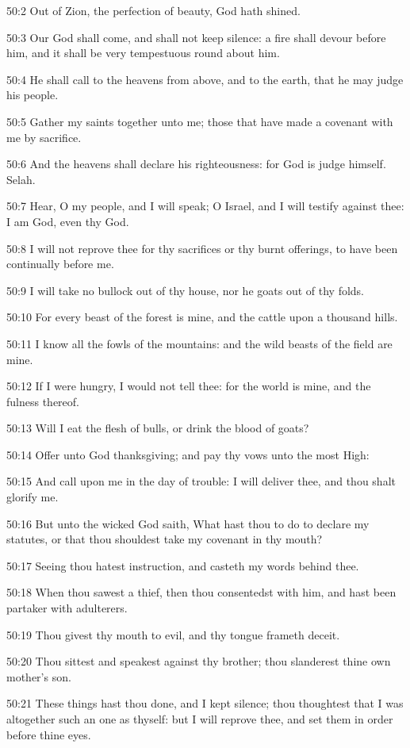 50:2 Out of Zion, the perfection of beauty, God hath shined.

50:3 Our God shall come, and shall not keep silence: a fire shall devour before him, and it shall be very tempestuous round about him.

50:4 He shall call to the heavens from above, and to the earth, that he may judge his people.

50:5 Gather my saints together unto me; those that have made a covenant with me by sacrifice.

50:6 And the heavens shall declare his righteousness: for God is judge himself. Selah.

50:7 Hear, O my people, and I will speak; O Israel, and I will testify against thee: I am God, even thy God.

50:8 I will not reprove thee for thy sacrifices or thy burnt offerings, to have been continually before me.

50:9 I will take no bullock out of thy house, nor he goats out of thy folds.

50:10 For every beast of the forest is mine, and the cattle upon a thousand hills.

50:11 I know all the fowls of the mountains: and the wild beasts of the field are mine.

50:12 If I were hungry, I would not tell thee: for the world is mine, and the fulness thereof.

50:13 Will I eat the flesh of bulls, or drink the blood of goats?

50:14 Offer unto God thanksgiving; and pay thy vows unto the most High:

50:15 And call upon me in the day of trouble: I will deliver thee, and thou shalt glorify me.

50:16 But unto the wicked God saith, What hast thou to do to declare my statutes, or that thou shouldest take my covenant in thy mouth?

50:17 Seeing thou hatest instruction, and casteth my words behind thee.

50:18 When thou sawest a thief, then thou consentedst with him, and hast been partaker with adulterers.

50:19 Thou givest thy mouth to evil, and thy tongue frameth deceit.

50:20 Thou sittest and speakest against thy brother; thou slanderest thine own mother's son.

50:21 These things hast thou done, and I kept silence; thou thoughtest that I was altogether such an one as thyself: but I will reprove thee, and set them in order before thine eyes.

